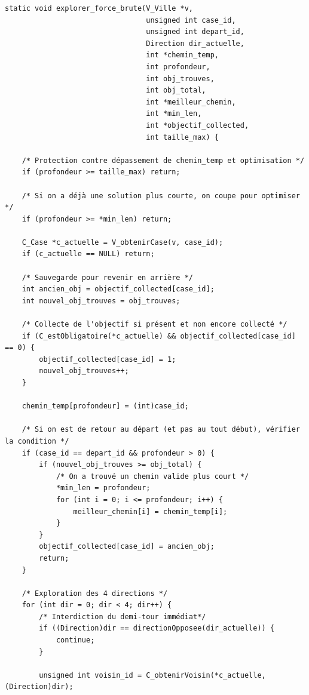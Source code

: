 \begin{lstlisting}[caption={explorer\_force\_brute}]
static void explorer_force_brute(V_Ville *v,
                                 unsigned int case_id,
                                 unsigned int depart_id,
                                 Direction dir_actuelle,
                                 int *chemin_temp,
                                 int profondeur,
                                 int obj_trouves,
                                 int obj_total,
                                 int *meilleur_chemin,
                                 int *min_len,
                                 int *objectif_collected,
                                 int taille_max) {

    /* Protection contre dépassement de chemin_temp et optimisation */
    if (profondeur >= taille_max) return;

    /* Si on a déjà une solution plus courte, on coupe pour optimiser */
    if (profondeur >= *min_len) return;

    C_Case *c_actuelle = V_obtenirCase(v, case_id);
    if (c_actuelle == NULL) return;

    /* Sauvegarde pour revenir en arrière */
    int ancien_obj = objectif_collected[case_id];
    int nouvel_obj_trouves = obj_trouves;

    /* Collecte de l'objectif si présent et non encore collecté */
    if (C_estObligatoire(*c_actuelle) && objectif_collected[case_id] == 0) {
        objectif_collected[case_id] = 1;
        nouvel_obj_trouves++;
    }

    chemin_temp[profondeur] = (int)case_id;

    /* Si on est de retour au départ (et pas au tout début), vérifier la condition */
    if (case_id == depart_id && profondeur > 0) {
        if (nouvel_obj_trouves >= obj_total) {
            /* On a trouvé un chemin valide plus court */
            *min_len = profondeur;
            for (int i = 0; i <= profondeur; i++) {
                meilleur_chemin[i] = chemin_temp[i];
            }
        }
        objectif_collected[case_id] = ancien_obj;
        return;
    }

    /* Exploration des 4 directions */
    for (int dir = 0; dir < 4; dir++) {
        /* Interdiction du demi-tour immédiat*/
        if ((Direction)dir == directionOpposee(dir_actuelle)) {
            continue;
        }

        unsigned int voisin_id = C_obtenirVoisin(*c_actuelle, (Direction)dir);


\end{lstlisting}
